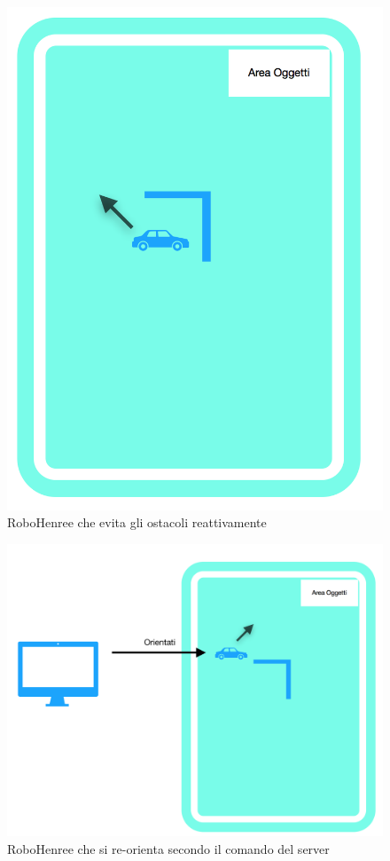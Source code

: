 \documentclass[a4paper,12pt,italian]{article}
\begin{document}
\begin{figure}[H]
	\begin{center}
	\includegraphics[scale=0.3]{movimento_3.png}
	\caption{RoboHenree che evita gli ostacoli reattivamente}
	\label{Fig: movimento_3}
	\end{center}
\end{figure}

\begin{figure}[H]
	\begin{center}
	\includegraphics[scale=0.3]{movimento_4.png}
	\caption{RoboHenree che si re-orienta secondo il comando del server}
	\label{Fig: movimento_4}
	\end{center}
\end{figure}
\end{document}
